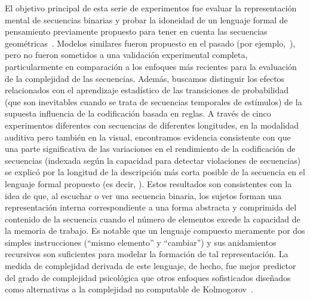 El objetivo principal de esta serie de experimentos fue evaluar la representación mental de secuencias binarias y probar la idoneidad de un lenguaje formal de pensamiento previamente propuesto para tener en cuenta las secuencias geométricas~\cite{amalric2017language}. Modelos similares fueron propuesto en el pasado (por ejemplo,~\cite{f32,f36,f45}), pero no fueron sometidos a una validación experimental completa, particularmente en comparación a los enfoques más recientes para la evaluación de la complejidad de las secuencias. Además, buscamos distinguir los efectos relacionados con el aprendizaje estadístico de las transiciones de probabilidad (que son inevitables cuando se trata de secuencias temporales de estímulos) de la supuesta influencia de la codificación basada en reglas. A través de cinco experimentos diferentes con secuencias de diferentes longitudes, en la modalidad auditiva pero también en la visual, encontramos evidencia consistente con que una parte significativa de las variaciones en el rendimiento de la codificación de secuencias (indexada según la capacidad para detectar violaciones de secuencias) se explicó por la longitud de la descripción más corta posible de la secuencia en el lenguaje formal propuesto (es decir, \mdlbin). Estos resultados son consistentes con la idea de que, al escuchar o ver una secuencia binaria, los sujetos forman una representación interna correspondiente a una forma abstracta y comprimida del contenido de la secuencia cuando el número de elementos excede la capacidad de la memoria de trabajo. Es notable que un lenguaje compuesto meramente por dos simples instrucciones (``mismo elemento'' y ``cambiar'') y sus anidamientos recursivos son suficientes para modelar la formación de tal representación. La medida de complejidad derivada de este lenguaje, de hecho, fue mejor predictor del grado de complejidad psicológica que otros enfoques sofisticados diseñados como alternativas a la complejidad no computable de Kolmogorov~\cite{f46,f47}.


